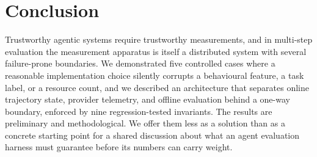 \documentclass[letterpaper]{article}
\begin{document}
\section{Conclusion}

Trustworthy agentic systems require trustworthy measurements, and in multi-step
evaluation the measurement apparatus is itself a distributed system with several
failure-prone boundaries. We demonstrated five controlled cases where a
reasonable implementation choice silently corrupts a behavioural feature, a task
label, or a resource count, and we described an architecture that separates
online trajectory state, provider telemetry, and offline evaluation behind a
one-way boundary, enforced by nine regression-tested invariants. The results are
preliminary and methodological. We offer them less as a solution than as a
concrete starting point for a shared discussion about what an agent evaluation
harness must guarantee before its numbers can carry weight.



\end{document}

